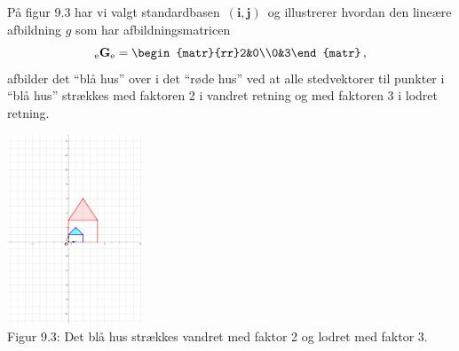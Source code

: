 \begin{example}
På figur 9.3 har vi valgt standardbasen $\,(\mathbf i,\mathbf j)\,$ og illustrerer hvordan den lineære afbildning $g$ som har afbildningsmatricen 
\begin{equation*}
\matind eGe=\begin{matr}{rr}2&0\\0&3\end{matr}\,,
\end{equation*}
afbilder det ``blå hus'' over i det ``røde hus'' ved at alle stedvektorer til punkter i ``blå hus'' strækkes med faktoren 2 i vandret retning og med faktoren 3 i lodret retning.
\begin{center}
\includegraphics[trim=8cm 11.4cm 5.3cm 9.4cm,width=0.30\textwidth,clip]{Hus2.pdf} \\
Figur 9.3: Det blå hus strækkes vandret med faktor 2 og lodret med faktor 3.	
\end{center}


\end{example}
